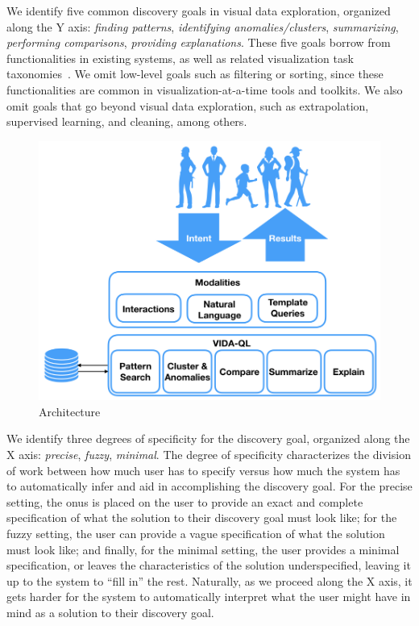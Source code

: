 \par
 We identify five 
common discovery goals in visual data exploration, organized
along the Y axis:
{\em finding patterns}, {\em identifying anomalies/clusters}, {\em summarizing}, 
{\em performing comparisons}, {\em providing explanations}.
These five goals borrow from functionalities in existing
systems, as well as related visualization task taxonomies~\cite{Amar2005,Heer2012}.
We omit low-level goals such as filtering or sorting, since
these functionalities are common in 
visualization-at-a-time tools and toolkits.
We also omit goals that go beyond visual data exploration,
such as extrapolation, supervised learning, and cleaning, among others. 

\begin{figure}
\centering
\vspace{-10pt}
\includegraphics[width=\linewidth]{figures/VIDA_architecture.png}
\vspace{-25pt}
\caption{\vida Architecture\label{fig:vida_architecture}
\vspace{-15pt}
}
\end{figure}


\par 
 We identify three degrees of specificity
for the discovery goal, organized along the X axis:
{\em precise}, {\em fuzzy}, {\em minimal}.
The degree of specificity characterizes the division
of work between how much user has to specify
versus how much the system has to automatically
infer and aid in accomplishing the discovery goal. 
For the precise setting, the onus is placed on the user
to provide an exact and complete specification of 
what the solution to their discovery
goal must look like;
for the fuzzy setting, the user can provide
a vague specification of what the solution must look like;
and finally, for the minimal setting,
the user provides a minimal specification, or
leaves the characteristics of the solution underspecified,
leaving it up to the system to ``fill in'' the rest.
Naturally, as we proceed along the X axis,
it gets harder for the system to automatically
interpret what the user might have in mind as a solution
to their discovery goal.


